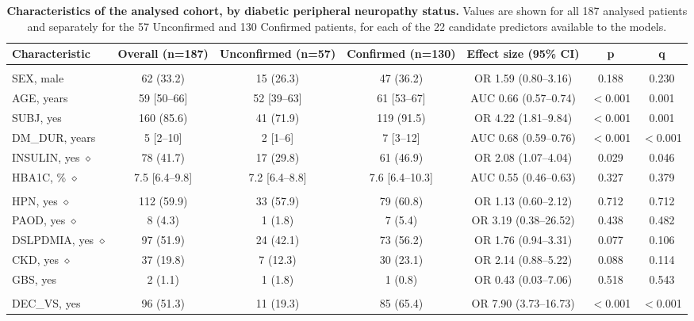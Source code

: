 \begin{table}[!ht]
\centering
\footnotesize
\caption{\textbf{Characteristics of the analysed cohort, by diabetic peripheral neuropathy status.} Values are shown for all 187 analysed patients and separately for the 57 Unconfirmed and 130 Confirmed patients, for each of the 22 candidate predictors available to the models.}
\label{tab:cohort}
\begin{tabular}{lcccccc}
\toprule
\textbf{Characteristic} & \textbf{Overall} (n=187) & \textbf{Unconfirmed} (n=57) & \textbf{Confirmed} (n=130) & \textbf{Effect size (95\% CI)} & \textbf{p} & \textbf{q} \\
\midrule
\addlinespace
\multicolumn{7}{l}{\textit{Profile}} \\
SEX, male  & 62 (33.2) & 15 (26.3) & 47 (36.2) & OR 1.59 (0.80--3.16) & 0.188 & 0.230 \\
AGE, years  & 59 [50--66] & 52 [39--63] & 61 [53--67] & AUC 0.66 (0.57--0.74) & $<$0.001 & 0.001 \\
SUBJ, yes  & 160 (85.6) & 41 (71.9) & 119 (91.5) & OR 4.22 (1.81--9.84) & $<$0.001 & 0.001 \\
DM\_DUR, years  & 5 [2--10] & 2 [1--6] & 7 [3--12] & AUC 0.68 (0.59--0.76) & $<$0.001 & $<$0.001 \\
INSULIN, yes $\diamond$ & 78 (41.7) & 17 (29.8) & 61 (46.9) & OR 2.08 (1.07--4.04) & 0.029 & 0.046 \\
HBA1C, \% $\diamond$ & 7.5 [6.4--9.8] & 7.2 [6.4--8.8] & 7.6 [6.4--10.3] & AUC 0.55 (0.46--0.63) & 0.327 & 0.379 \\
\addlinespace
\multicolumn{7}{l}{\textit{Comorbidity}} \\
HPN, yes $\diamond$ & 112 (59.9) & 33 (57.9) & 79 (60.8) & OR 1.13 (0.60--2.12) & 0.712 & 0.712 \\
PAOD, yes $\diamond$ & 8 (4.3) & 1 (1.8) & 7 (5.4) & OR 3.19 (0.38--26.52) & 0.438 & 0.482 \\
DSLPDMIA, yes $\diamond$ & 97 (51.9) & 24 (42.1) & 73 (56.2) & OR 1.76 (0.94--3.31) & 0.077 & 0.106 \\
CKD, yes $\diamond$ & 37 (19.8) & 7 (12.3) & 30 (23.1) & OR 2.14 (0.88--5.22) & 0.088 & 0.114 \\
GBS, yes  & 2 (1.1) & 1 (1.8) & 1 (0.8) & OR 0.43 (0.03--7.06) & 0.518 & 0.543 \\
\addlinespace
\multicolumn{7}{l}{\textit{Neurological examination}} \\
DEC\_VS, yes  & 96 (51.3) & 11 (19.3) & 85 (65.4) & OR 7.90 (3.73--16.73) & $<$0.001 & $<$0.001 \\

\end{tabular}
\end{table}
